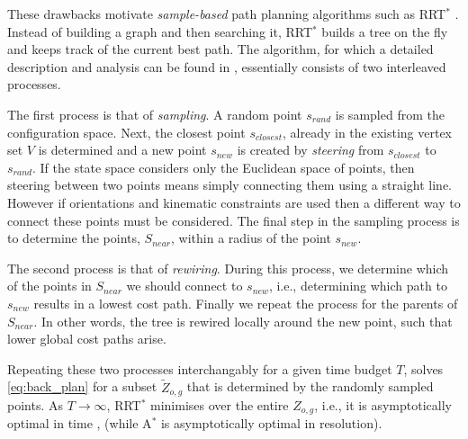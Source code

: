 \documentclass{article}  %
\begin{document}
These drawbacks motivate \emph{sample-based} path planning algorithms such as RRT$^*$ . Instead of building a graph and then searching it, RRT$^*$ builds a tree on the fly and keeps track of the current best path. The algorithm, for which a detailed description and analysis can be found in \cite{karaman2011sampling}, essentially consists of two interleaved processes. 

The first process is that of \emph{sampling}. A random point $s_{rand}$ is sampled from the configuration space. Next, the closest point $s_{closest}$, already in the existing vertex set $V$ is determined and a new point $s_{new}$ is created by \emph{steering} from  $s_{closest}$ to $s_{rand}$. If the state space considers only the Euclidean space of points, then steering between two points means simply connecting them using a straight line. However if orientations and kinematic constraints are used then a different way to connect these points must be considered. The final step in the sampling process is to determine the points, $S_{near}$, within a radius of the point $s_{new}$.

The second process is that of \emph{rewiring}. During this process, we determine which of the points in $S_{near}$ we should connect to $s_{new}$, i.e., determining which path to $s_{new}$ results in a lowest cost path. Finally we repeat the process for the parents of $S_{near}$. In other words, the tree is rewired locally around the new point, such that lower global cost paths arise.

Repeating these two processes interchangably for a given time budget $T$, solves \eqref{eq:back_plan} for a subset $\tilde{Z}_{o,g}$ that is determined by the randomly sampled points. As $T \rightarrow \infty$, RRT$^*$ minimises over the entire $Z_{o,g}$, i.e., it is asymptotically optimal in time \cite{karaman2011sampling}, (while A$^*$ is asymptotically optimal in resolution).




\end{document}
